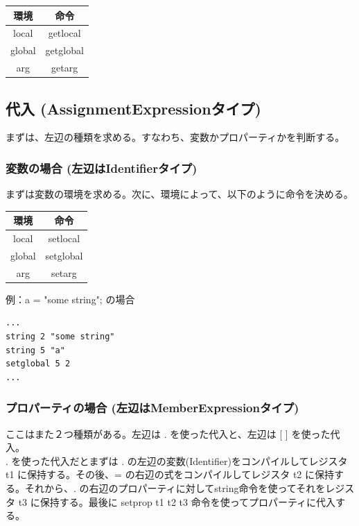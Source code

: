 \documentclass[12pt]{article}
\begin{document}
\begin{table}[h]
\centering
\begin{tabular}{|c|c|}
	\hline
	環境 & 命令 \\
	\hline
 	local & getlocal \\
	global & getglobal \\
	arg & getarg \\
	\hline
\end{tabular}
\end{table}

\subsection{代入 (AssignmentExpressionタイプ)}
まずは、左辺の種類を求める。すなわち、変数かプロパーティかを判断する。

\subsubsection{変数の場合 (左辺はIdentifierタイプ)}
まずは変数の環境を求める。次に、環境によって、以下のように命令を決める。

\begin{table}[h]
\centering
\begin{tabular}{|c|c|}
	\hline
	環境 & 命令 \\
	\hline
 	local & setlocal \\
	global & setglobal \\
	arg & setarg \\
	\hline
\end{tabular}
\end{table}
\FloatBarrier

例：a = "some string"; の場合\\

\begin{lstlisting}
...
string 2 "some string"
string 5 "a"
setglobal 5 2
...
\end{lstlisting}
\FloatBarrier

\subsubsection{プロパーティの場合 (左辺はMemberExpressionタイプ)}
ここはまた２つ種類がある。左辺は . を使った代入と、左辺は [ ] を使った代入。\\

. を使った代入だとまずは . の左辺の変数(Identifier)をコンパイルしてレジスタ t1 に保持する。その後、= の右辺の式をコンパイルしてレジスタ t2 に保持する。それから、. の右辺のプロパーティに対してstring命令を使ってそれをレジスタ t3 に保持する。最後に setprop t1 t2 t3 命令を使ってプロパーティに代入する。\\
\end{document}
